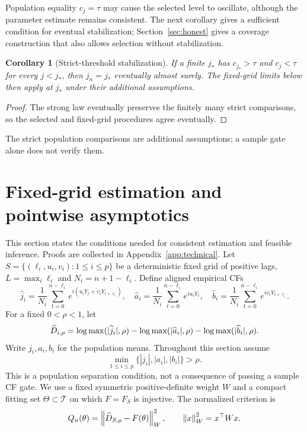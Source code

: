 \documentclass[11pt,a4paper]{article}
\newtheorem{corollary}[theorem]{Corollary}
\theoremstyle{remark}\newtheorem{remark}[theorem]{Remark}
\begin{document}
Population equality $c_j=\tau$ may cause the selected level to oscillate, although the parameter estimate remains consistent. The next corollary gives a sufficient condition for eventual stabilization; Section~\ref{sec:honest} gives a coverage construction that also allows selection without stabilization.

\begin{corollary}[Strict-threshold stabilization]\label{cor:stabilize}
If a finite $j_*$ has $c_{j_*}>\tau$ and $c_j<\tau$ for every $j<j_*$, then $j_n=j_*$ eventually almost surely. The fixed-grid limits below then apply at $j_*$ under their additional assumptions.
\end{corollary}
\begin{proof}
The strong law eventually preserves the finitely many strict comparisons, so the selected and fixed-grid procedures agree eventually.
\end{proof}
The strict population comparisons are additional assumptions; a sample gate alone does not verify them.

\section{Fixed-grid estimation and pointwise asymptotics}\label{sec:stats}
This section states the conditions needed for consistent estimation and feasible inference. Proofs are collected in Appendix~\ref{app:technical}.
Let $S=\{(\ell_i,u_i,v_i):1\le i\le p\}$ be a deterministic fixed grid of positive lags, $L=\max_i\ell_i$ and $N_i=n+1-\ell_i$. Define aligned empirical CFs
\begin{equation}\label{eq:ecf}
\widehat j_i=\frac1{N_i}\sum_{t=0}^{n-\ell_i}e^{i(u_iY_t+v_iY_{t+\ell_i})},\quad
\widehat a_i=\frac1{N_i}\sum_{t=0}^{n-\ell_i}e^{iu_iY_t},\quad
\widehat b_i=\frac1{N_i}\sum_{t=0}^{n-\ell_i}e^{iv_iY_{t+\ell_i}}.
\end{equation}
For a fixed $0<\rho<1$, let
\begin{equation}\label{eq:floor}
\widehat D_{i,\rho}=\log\max(|\widehat j_i|,\rho)-\log\max(|\widehat a_i|,\rho)
-\log\max(|\widehat b_i|,\rho).
\end{equation}
Write $j_i,a_i,b_i$ for the population means. Throughout this section assume
\begin{equation}\label{eq:safe}
\min_{1\le i\le p}\{|j_i|,|a_i|,|b_i|\}>\rho.
\end{equation}
This is a population separation condition, not a consequence of passing a sample CF gate. We use a fixed symmetric positive-definite weight $W$ and a compact fitting set $\Theta\subset\mathcal T$ on which $F=F_S$ is injective. The normalized criterion is
\begin{equation}\label{eq:criterion}
Q_n(\theta)=\left\lVert\widehat D_{S,\rho}-F(\theta)\right\rVert_W^2,\qquad
\left\lVert x\right\rVert_W^2=x^\top Wx.
\end{equation}
\end{document}
